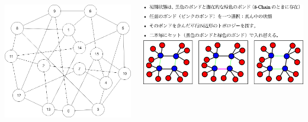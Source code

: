 \documentclass[12pt, dvipdfmx]{beamer}
\begin{document}
\begin{frame}
\begin{columns}[T, onlytextwidth]
				\vspace{-5mm}
				\begin{center}
					\includegraphics[width=.65\textwidth]{Network.png}
				\end{center}
				\includegraphics[width=\textwidth]{bond_exchg.png}
		\end{columns}
\end{frame}
\end{document}
